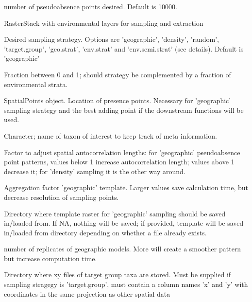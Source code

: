 \documentclass[a4paper]{book}
\begin{document}
\begin{Arguments}
\begin{ldescription}
\item[\code{n}] number of pseudoabsence points desired. Default is 10000.

\item[\code{env.stack}] RasterStack with environmental layers for sampling and
extraction

\item[\code{type}] Desired sampling strategy. Options are 'geographic', 'density',
'random', 'target.group', 'geo.strat', 'env.strat' and 'env.semi.strat'
(see details). Default is 'geographic'

\item[\code{add.strat}] Fraction between 0 and 1; should strategy be complemented
by a fraction of environmental strata.

\item[\code{pres}] SpatialPoints object. Location of presence points. Necessary for
'geographic' sampling strategy and the best adding point if the downstream
functions will be used.

\item[\code{taxon}] Character; name of taxon of interest to keep track of meta
information.

\item[\code{geodist\_fact}] Factor to adjust spatial autocorrelation lengths: for
'geographic' pseudoabsence point patterns, values below 1 increase
autocorrelation length; values above 1 decrease it; for 'density' sampling
it is the other way around.

\item[\code{geores\_fact}] Aggregation factor 'geographic' template. Larger values
save calculation time, but decrease resolution of sampling points.

\item[\code{template\_dir}] Directory where template raster for 'geographic'
sampling should be saved in/loaded from. If NA, nothing will be saved; if
provided, template will be saved in/loaded from directory depending on
whether a file already exists.

\item[\code{geo\_nrep}] number of replicates of geographic models. More will create
a smoother pattern but increase computation time.

\item[\code{target.group\_dir}] Directory where xy files of target group taxa are
stored. Must be supplied if sampling stragegy is 'target.group', must contain
a column names 'x' and 'y' with coordinates in the same projection as other
spatial data


\end{ldescription}
\end{Arguments}
\end{document}
